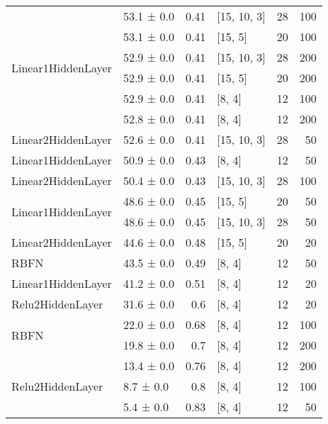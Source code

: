 \begin{table*}[h]
\begin{tabular}{llrlrr}
 \hline
\multirow{6}{*}{Linear1HiddenLayer}         & 53.1 ± 0.0 &  0.41 & [15, 10, 3]    &         28 &      100 \\
         & 53.1 ± 0.0 &  0.41 & [15, 5]        &         20 &      100 \\
         & 52.9 ± 0.0 &  0.41 & [15, 10, 3]    &         28 &      200 \\
         & 52.9 ± 0.0 &  0.41 & [15, 5]        &         20 &      200 \\
         & 52.9 ± 0.0 &  0.41 & [8, 4]         &         12 &      100 \\
         & 52.8 ± 0.0 &  0.41 & [8, 4]         &         12 &      200 \\
 \hline
Linear2HiddenLayer         & 52.6 ± 0.0 &  0.41 & [15, 10, 3]    &         28 &       50 \\
 \hline
Linear1HiddenLayer         & 50.9 ± 0.0 &  0.43 & [8, 4]         &         12 &       50 \\
 \hline
Linear2HiddenLayer         & 50.4 ± 0.0 &  0.43 & [15, 10, 3]    &         28 &      100 \\
 \hline
\multirow{2}{*}{Linear1HiddenLayer}         & 48.6 ± 0.0 &  0.45 & [15, 5]        &         20 &       50 \\
         & 48.6 ± 0.0 &  0.45 & [15, 10, 3]    &         28 &       50 \\
 \hline
Linear2HiddenLayer         & 44.6 ± 0.0 &  0.48 & [15, 5]        &         20 &       20 \\
 \hline
RBFN         & 43.5 ± 0.0 &  0.49 & [8, 4]         &         12 &       50 \\
 \hline
Linear1HiddenLayer         & 41.2 ± 0.0 &  0.51 & [8, 4]         &         12 &       20 \\
 \hline
Relu2HiddenLayer         & 31.6 ± 0.0 &  0.6  & [8, 4]         &         12 &       20 \\
 \hline
\multirow{2}{*}{RBFN}         & 22.0 ± 0.0 &  0.68 & [8, 4]         &         12 &      100 \\
         & 19.8 ± 0.0 &  0.7  & [8, 4]         &         12 &      200 \\
 \hline
\multirow{3}{*}{Relu2HiddenLayer}         & 13.4 ± 0.0 &  0.76 & [8, 4]         &         12 &      200 \\
         & 8.7 ± 0.0  &  0.8  & [8, 4]         &         12 &      100 \\
         & 5.4 ± 0.0  &  0.83 & [8, 4]         &         12 &       50 \\

\end{tabular}
\end{table*}
